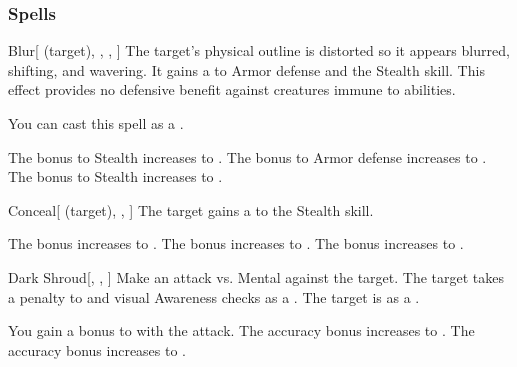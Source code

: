\subsubsection{Spells}


\lowercase{\hypertarget{spell:Blur}{}}\label{spell:Blur}
\begin{attuneability}[Rank 1]{\hypertarget{spell:Blur}{Blur}}[ (target), , , ]
The target's physical outline is distorted so it appears blurred, shifting, and wavering.
It gains a   to Armor defense and the Stealth skill.
This effect provides no defensive benefit against creatures immune to  abilities.

You can cast this spell as a .

\rankline
{} The bonus to Stealth increases to .
 The bonus to Armor defense increases to .
 The bonus to Stealth increases to .
\end{attuneability}
\vspace{0.25em}



\lowercase{\hypertarget{spell:Conceal}{}}\label{spell:Conceal}
\begin{attuneability}[Rank 1]{\hypertarget{spell:Conceal}{Conceal}}[ (target), , ]
The target gains a   to the Stealth skill.

\rankline
{} The bonus increases to .
 The bonus increases to .
 The bonus increases to .
\end{attuneability}
\vspace{0.25em}



\lowercase{\hypertarget{spell:Dark Shroud}{}}\label{spell:Dark Shroud}
\begin{freeability}[Rank 1]{\hypertarget{spell:Dark Shroud}{Dark Shroud}}[, , ]
Make an attack vs. Mental against the target.
\hit The target takes a  penalty to  and visual Awareness checks as a .
\crit The target is  as a .

\rankline
{} You gain a  bonus to  with the attack.
 The accuracy bonus increases to .
 The accuracy bonus increases to .
\end{freeability}
\vspace{0.25em}



